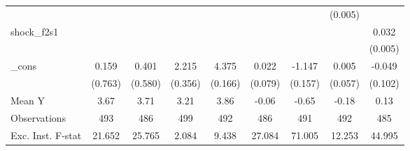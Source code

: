 {\begin{tabular}{l*{8}{c}}
            &                     &                     &                     &                     &                     &                     &     (0.005)         &                     \\
\addlinespace
shock\_f2s1  &                     &                     &                     &                     &                     &                     &                     &       0.032\sym{***}\\
            &                     &                     &                     &                     &                     &                     &                     &     (0.005)         \\
\addlinespace
\_cons      &       0.159         &       0.401         &       2.215\sym{***}&       4.375\sym{***}&       0.022         &      -1.147\sym{***}&       0.005         &      -0.049         \\
            &     (0.763)         &     (0.580)         &     (0.356)         &     (0.166)         &     (0.079)         &     (0.157)         &     (0.057)         &     (0.102)         \\
\midrule
Mean Y      &        3.67         &        3.71         &        3.21         &        3.86         &       -0.06         &       -0.65         &       -0.18         &        0.13         \\
Observations&         493         &         486         &         499         &         492         &         486         &         491         &         492         &         485         \\
Exc. Inst. F-stat&      21.652         &      25.765         &       2.084         &       9.438         &      27.084         &      71.005         &      12.253         &      44.995         \\
\bottomrule
\end{tabular}
}
